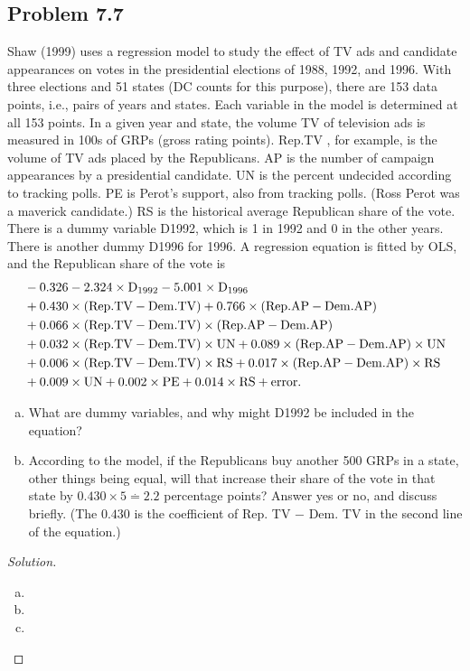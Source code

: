 \documentclass{amsart}
\begin{document}
		\subsection{Problem 7.7} %
		\label{sub:problem_7_7}
			Shaw (1999) uses a regression model to study the effect of TV ads and candidate appearances on votes in the presidential elections of 1988, 1992, and 1996. 
			With three elections and 51 states (DC counts for this purpose), there are 153 data points, i.e., pairs of years and states. 
			Each variable in the model is determined at all 153 points. In a given year and state, the volume TV of television ads is measured in 100s of GRPs (gross rating points). 
			Rep.TV , for example, is the volume of TV ads placed by the Republicans. 
			AP is the number of campaign appearances by a presidential candidate. 
			UN is the percent undecided according to tracking polls. 
			PE is Perot’s support, also from tracking polls. 
			(Ross Perot was a maverick candidate.) 
			RS is the historical average Republican share of the vote. 
			There is a dummy variable D1992, which is 1 in 1992 and 0 in the other years. 
			There is another dummy D1996 for 1996. 
			A regression equation is fitted by OLS, and the Republican share of the vote is
			\begin{align*}
				&\rm- 0.326 - 2.324\times D_{1992} - 5.001\times D_{1996} \\
				&\rm + 0.430 \times (Rep. TV - Dem. TV ) + 0.766\times (Rep. AP - Dem. AP ) \\
				&\rm + 0.066 \times (Rep. TV - Dem. TV ) \times (Rep. AP - Dem. AP ) \\
				&\rm + 0.032 \times (Rep. TV - Dem. TV ) \times UN + 0.089 \times (Rep. AP - Dem. AP )\times UN \\
				&\rm + 0.006 \times (Rep. TV - Dem. TV ) \times RS + 0.017 \times (Rep. AP - Dem. AP )\times RS \\
				&\rm + 0.009 \times UN + 0.002 \times PE + 0.014 \times RS + error.
			\end{align*}
			\begin{enumerate}[(a)]
				\item What are dummy variables, and why might D1992 be included in the equation?
				\item According to the model, if the Republicans buy another 500 GRPs in a state, other things being equal, will that increase their share of the vote in that state by $0.430 \times 5 \stackrel{.}{=} 2.2$ percentage points?
				Answer yes or no, and discuss briefly. 
				(The $0.430$ is the coefficient of Rep. TV − Dem. TV in the second line of the equation.)
			\end{enumerate}
		\begin{proof}[Solution] \
			\begin{enumerate}[(a)]
				\item 
				\item 
				\item 
			\end{enumerate}
		\end{proof}
\end{document}
